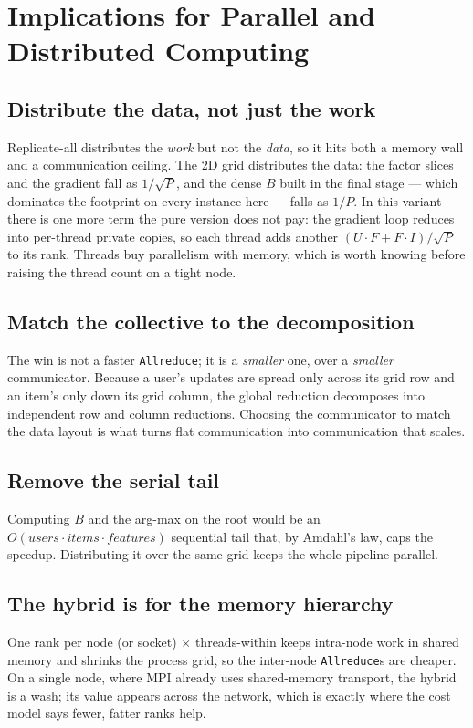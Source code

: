 \documentclass[twocolumn]{article}
\begin{document}
    \section{Implications for Parallel and Distributed Computing}\label{sec:pdc}

    \subsection{Distribute the data, not just the work}\label{subsec:distribute}
    Replicate-all distributes the \emph{work} but not the \emph{data}, so it hits both a
    memory wall and a communication ceiling. The 2D grid distributes the data: the factor
    slices and the gradient fall as $1/\sqrt{P}$, and the dense $B$ built in the final
    stage --- which dominates the footprint on every instance here --- falls as $1/P$. In
    this variant there is one more term the pure version does not pay: the gradient loop
    reduces into per-thread private copies, so each thread adds another
    $(U\!\cdot\!F + F\!\cdot\!I)/\sqrt{P}$ to its rank. Threads buy parallelism with
    memory, which is worth knowing before raising the thread count on a tight node.

    \subsection{Match the collective to the decomposition}\label{subsec:collective}
    The win is not a faster \texttt{Allreduce}; it is a \emph{smaller} one, over a
    \emph{smaller} communicator. Because a user's updates are spread only across its grid
    row and an item's only down its grid column, the global reduction decomposes into
    independent row and column reductions. Choosing the communicator to match the data
    layout is what turns flat communication into communication that scales.

    \subsection{Remove the serial tail}\label{subsec:tail}
    Computing $B$ and the arg-max on the root would be an
    $O(\textit{users} \cdot \textit{items} \cdot \textit{features})$ sequential tail that,
    by Amdahl's law, caps the speedup. Distributing it over the same grid keeps the whole
    pipeline parallel.

    \subsection{The hybrid is for the memory hierarchy}\label{subsec:hierarchy}
    One rank per node (or socket) $\times$ threads-within keeps intra-node work in shared
    memory and shrinks the process grid, so the inter-node \texttt{Allreduce}s are cheaper.
    On a single node, where MPI already uses shared-memory transport, the hybrid is a
    wash; its value appears across the network, which is exactly where the cost model says
    fewer, fatter ranks help.
\end{document}
